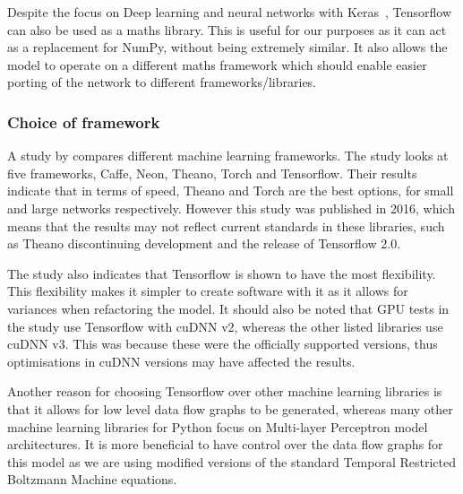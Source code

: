 Despite the focus on Deep learning and neural networks with Keras~\citep{tensorflowtutorials}, Tensorflow can also be used as a maths library.
This is useful for our purposes as it can act as a replacement for NumPy, without being extremely similar. 
It also allows the model to operate on a different maths framework which should enable easier porting of the network to different frameworks/libraries.


\subsubsection{Choice of framework}
A study by \citep{bahrampour2015comparative} compares different machine learning frameworks.
The study looks at five frameworks, Caffe, Neon, Theano, Torch and Tensorflow.
Their results indicate that in terms of speed, Theano and Torch are the best options, for small and large networks respectively.
However this study was published in 2016, which means that the results may not reflect current standards in these libraries, such as Theano discontinuing development and the release of Tensorflow 2.0.

The study also indicates that Tensorflow is shown to have the most flexibility. 
This flexibility makes it simpler to create software with it as it allows for variances when refactoring the model.
It should also be noted that GPU tests in the study use Tensorflow with cuDNN v2, whereas the other listed libraries use cuDNN v3.
This was because these were the officially supported versions, thus optimisations in cuDNN versions may have affected the results.

Another reason for choosing Tensorflow over other machine learning libraries 
is that it allows for low level data flow graphs to be generated, whereas many other machine learning libraries for Python focus on Multi-layer Perceptron model architectures. It is more beneficial to have control over the data flow graphs for this model as we are using modified versions of the standard Temporal Restricted Boltzmann Machine equations. 



